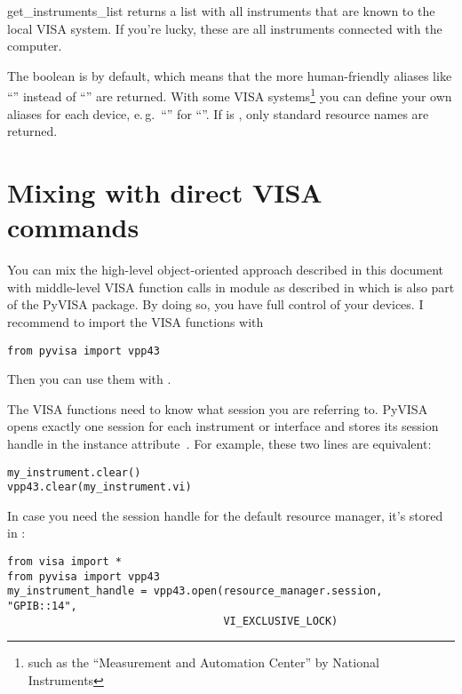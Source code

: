 \documentclass{howto}
\begin{document}
\begin{funcdesc}{get_instruments_list}{}
  returns a list with all instruments that are known to the local VISA system.
  If you're lucky, these are all instruments connected with the computer.

  The boolean  is  by default, which means that the
  more human-friendly aliases like ``'' instead of ``''
  are returned.  With some VISA systems\footnote{such as the ``Measurement and
    Automation Center'' by National Instruments} you can define your own
  aliases for each device, e.\,g.\ ``'' for
  ``''.  If  is , only
  standard resource names are returned.
\end{funcdesc}


\section{Mixing with direct VISA commands}

You can mix the high-level object-oriented approach described in this document
with middle-level VISA function calls in module  as described in
 which is also part of the PyVISA package.  By doing so, you
have full control of your devices.  I recommend to import the VISA functions
with
\begin{verbatim}
from pyvisa import vpp43
\end{verbatim}
Then you can use them with .

The VISA functions need to know what session you are referring to.  PyVISA
opens exactly one session for each instrument or interface and stores its
session handle in the instance attribute~.  For example, these two
lines are equivalent:
\begin{verbatim}
my_instrument.clear()
vpp43.clear(my_instrument.vi)
\end{verbatim}

In case you need the session handle for the default resource manager, it's
stored in :
\begin{verbatim}
from visa import *
from pyvisa import vpp43
my_instrument_handle = vpp43.open(resource_manager.session, "GPIB::14",
                                  VI_EXCLUSIVE_LOCK)
\end{verbatim}
\end{document}
